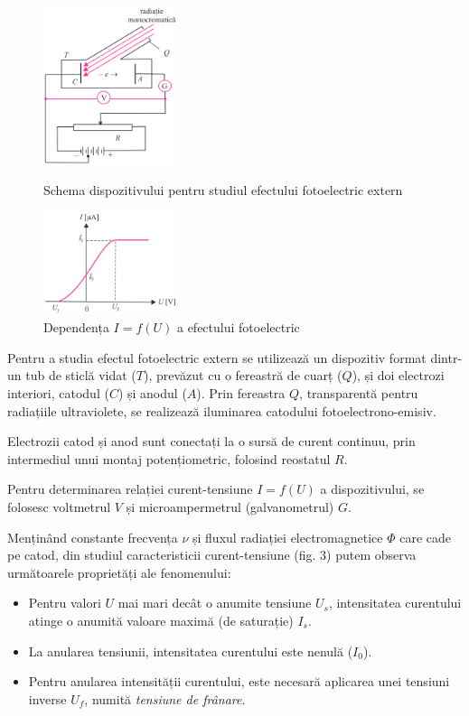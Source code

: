 \begin{figure}
    \includegraphics[width=0.35\textwidth]{fig/dispozitiv}
    \caption{Schema dispozitivului pentru studiul efectului fotoelectric extern}
    \vspace{1cm}
    \includegraphics[width=0.35\textwidth]{fig/graph_I_fU}
    \caption{Dependența \( I = f(U) \) a efectului fotoelectric}
\end{figure}

Pentru a studia efectul fotoelectric extern se utilizează un dispozitiv format
dintr-un tub de sticlă vidat ($T$), prevăzut cu o fereastră de cuarț ($Q$), și
doi electrozi interiori, catodul ($C$) și anodul ($A$). Prin fereastra $Q$,
transparentă pentru radiațiile ultraviolete, se realizează iluminarea catodului
fotoelectrono-emisiv.

Electrozii catod și anod sunt conectați la o sursă de curent continuu, prin
intermediul unui montaj potențiometric, folosind reostatul $R$.

Pentru determinarea relației curent-tensiune \( I = f(U) \) a dispozitivului,
se folosesc voltmetrul $V$ și microampermetrul (galvanometrul) $G$.

Menținând constante frecvența $\nu$ și fluxul radiației electromagnetice $\Phi$
care cade pe catod, din studiul caracteristicii curent-tensiune (fig. 3) putem
observa următoarele proprietăți ale fenomenului:

\begin{itemize}
    \item Pentru valori $U$ mai mari decât o anumite tensiune $U_s$, intensitatea
        curentului atinge o anumită valoare maximă (de saturație) $I_s$.
    \item La anularea tensiunii, intensitatea curentului este nenulă ($I_0$).
    \item Pentru anularea intensității curentului, este necesară aplicarea unei
        tensiuni inverse $U_f$, numită \emph{tensiune de frânare}.
\end{itemize}

